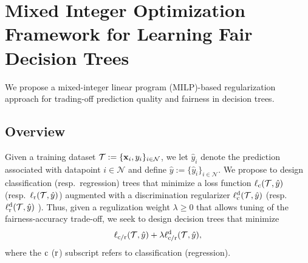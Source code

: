 \documentclass[letterpaper]{article} %
\theoremstyle{definition}
\newcommand{\1}{\ensuremath{{\rm e}}} %
\begin{document}
\section{Mixed Integer Optimization Framework for Learning Fair Decision Trees}
\label{sec:MIP-formulation}

We propose a mixed-integer linear program (MILP)-based regularization approach for trading-off prediction quality and fairness in decision trees. 

\subsection{Overview}
\label{sec:overview}
Given a training dataset $\mathcal T:=\{ {\bf x}_i, y_i \}_{i\in \mathcal N}$, we let $\hat y_i$ denote the prediction associated with datapoint $i \in \mathcal N$ and define $\hat y:=\{\hat y_i\}_{i \in \mathcal N}$. We propose to design classification (resp.\ regression) trees that minimize a loss function $\ell_{\rm c}(\mathcal T, \hat y)$ (resp.\ $\ell_{\rm r}(\mathcal T, \hat y)$) augmented with a discrimination regularizer $\ell^{\rm d}_{\rm c}(\mathcal T,\hat y)$ (resp.\ $\ell^{\rm d}_{\rm r}(\mathcal T,\hat y)$ ). Thus, given a regulization weight $\lambda \geq 0$ that allows tuning of the fairness-accuracy trade-off, we seek to design decision trees that minimize
\begin{equation}
\ell_{\rm c/\rm r}(\mathcal T, \hat y) + \lambda \ell^{\rm d}_{\rm c/\rm r}(\mathcal T,\hat y),
\label{eq:loss_objective}
\end{equation}
where the $\rm c$ ($\rm r$) subscript refers to classification (regression).%
\end{document}
